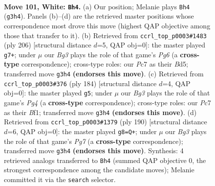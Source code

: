\documentclass[11pt]{article}
\begin{document}
\clearpage

\begin{figure}[p]\centering
\begin{subfigure}{0.46\textwidth}\centering
\resizebox{\linewidth}{!}{%
\newchessgame
\chessboard[
  setfen={5k2/2P5/6K1/8/8/6B1/8/8 w - - 27 101},
  showmover=false,
  pgfstyle=straightmove, color=movearrow, markmove={g3-h4}
]}
\caption{}
\end{subfigure}\hfill
\begin{subfigure}{0.46\textwidth}\centering
\resizebox{\linewidth}{!}{%
\newchessgame
\chessboard[
  setfen={7k/8/5KP1/3B4/8/8/8/8 w - - 5 104},
  showmover=false,
  pgfstyle=straightmove, color=movearrow, markmove={g6-g7}
]}
\caption{}
\end{subfigure}
\\[4pt]
\begin{subfigure}{0.46\textwidth}\centering
\resizebox{\linewidth}{!}{%
\newchessgame
\chessboard[
  setfen={8/4k3/8/8/6P1/6K1/8/5B2 w - - 0 93},
  showmover=false,
  pgfstyle=straightmove, color=movearrow, markmove={g4-g5}
]}
\caption{}
\end{subfigure}\hfill
\begin{subfigure}{0.46\textwidth}\centering
\resizebox{\linewidth}{!}{%
\newchessgame
\chessboard[
  setfen={8/6PK/4k3/8/8/8/8/8 w - - 3 96},
  showmover=false,
  pgfstyle=straightmove, color=movearrow, markmove={g7-g8}
]}
\caption{}
\end{subfigure}
\caption{\textbf{Move 101, White: \texttt{Bh4}.} (a) Our position; Melanie plays \texttt{Bh4} (\texttt{g3h4}). Panels (b)--(d) are the retrieved master positions whose correspondence most drove this move (highest QAP objective among those that transfer to it). (b) Retrieved from \texttt{ccrl\_top\_p0003\#1483} (ply 206) [structural distance $d$=5, QAP obj=0]: the master played \texttt{g7+}; under $\mu$ our \emph{Bg3} plays the role of that game's \emph{Pg6} (a \textbf{cross-type} correspondence); cross-type roles: our \emph{P}c7 as their \emph{B}d5; transferred move \texttt{g3h4} \textbf{(endorses this move)}. (c) Retrieved from \texttt{ccrl\_top\_p0003\#376} (ply 184) [structural distance $d$=4, QAP obj=0]: the master played \texttt{g5}; under $\mu$ our \emph{Bg3} plays the role of that game's \emph{Pg4} (a \textbf{cross-type} correspondence); cross-type roles: our \emph{P}c7 as their \emph{B}f1; transferred move \texttt{g3h4} \textbf{(endorses this move)}. (d) Retrieved from \texttt{ccrl\_top\_p0003\#1379} (ply 190) [structural distance $d$=6, QAP obj=0]: the master played \texttt{g8=Q+}; under $\mu$ our \emph{Bg3} plays the role of that game's \emph{Pg7} (a \textbf{cross-type} correspondence); transferred move \texttt{g3h4} \textbf{(endorses this move)}. Synthesis: 4 retrieved analogs transferred to \texttt{Bh4} (summed QAP objective 0, the strongest correspondence among the candidate moves); Melanie committed it via the \texttt{search} selector.}
\label{fig:thought-m200}
\end{figure}
\end{document}

